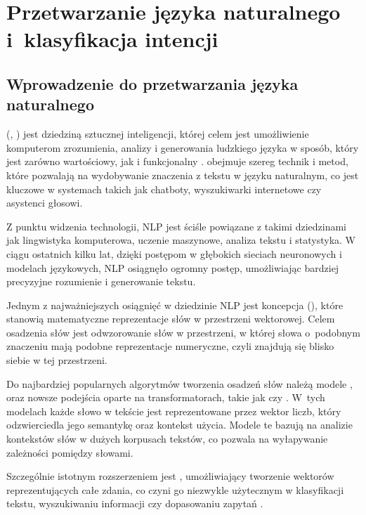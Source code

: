 \chapter{Przetwarzanie języka naturalnego i~klasyfikacja intencji}
\label{chapters:02-teoria}
	
	\section{Wprowadzenie do przetwarzania języka naturalnego}

	 (, ) jest dziedziną sztucznej inteligencji, której celem jest umożliwienie komputerom zrozumienia, analizy i generowania ludzkiego języka w sposób, który jest zarówno wartościowy, jak i funkcjonalny \cite{aggarwal2018textbook}.  obejmuje szereg technik i metod, które pozwalają na wydobywanie znaczenia z tekstu w języku naturalnym, co jest kluczowe w systemach takich jak chatboty, wyszukiwarki internetowe czy asystenci głosowi.
	
	Z punktu widzenia technologii, NLP jest ściśle powiązane z takimi dziedzinami jak lingwistyka komputerowa, uczenie maszynowe, analiza tekstu i statystyka. W ciągu ostatnich kilku lat, dzięki postępom w głębokich sieciach neuronowych i modelach językowych, NLP osiągnęło ogromny postęp, umożliwiając bardziej precyzyjne rozumienie i generowanie tekstu.
	
	Jednym z najważniejszych osiągnięć w dziedzinie NLP jest koncepcja  (), które stanowią matematyczne reprezentacje słów w przestrzeni wektorowej. Celem osadzenia słów jest odwzorowanie słów w przestrzeni, w której słowa o~podobnym znaczeniu mają podobne reprezentacje numeryczne, czyli znajdują się blisko siebie w tej przestrzeni.
	
	Do najbardziej popularnych algorytmów tworzenia osadzeń słów należą modele  \cite{aggarwal2018textbook},  \cite{pennington2014glove} oraz nowsze podejścia oparte na transformatorach, takie jak  \cite{devlin2018bert} czy  \cite{radford2019gpt2}. W~tych modelach każde słowo w tekście jest reprezentowane przez wektor liczb, który odzwierciedla jego semantykę oraz kontekst użycia. Modele te bazują na analizie kontekstów słów w dużych korpusach tekstów, co pozwala na wyłapywanie zależności pomiędzy słowami.
	
	Szczególnie istotnym rozszerzeniem jest , umożliwiający tworzenie wektorów reprezentujących całe zdania, co czyni go niezwykle użytecznym w klasyfikacji tekstu, wyszukiwaniu informacji czy dopasowaniu zapytań \cite{reimers2019sentencebert}.

